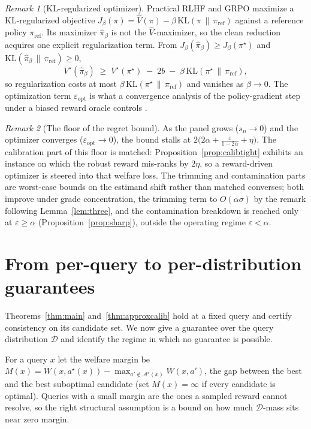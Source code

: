 \documentclass[11pt]{article}
\theoremstyle{plain}
\theoremstyle{definition}
\theoremstyle{remark}
\newtheorem{remark}{Remark}
\newcommand{\Ac}{\mathcal{A}}
\newcommand{\Dc}{\mathcal{D}}
\newcommand{\Wbar}{\overline{W}}
\newcommand{\eps}{\varepsilon}
\begin{document}
\begin{remark}[KL-regularized optimizer]
\label{rem:kl}
Practical RLHF and GRPO maximize a KL-regularized objective
$J_\beta(\pi)=\widehat V(\pi)-\beta\,\mathrm{KL}(\pi\,\|\,\pi_{\mathrm{ref}})$ against a reference
policy $\pi_{\mathrm{ref}}$. Its maximizer $\hat\pi_\beta$ is not the $\widehat V$-maximizer, so the
clean reduction acquires one explicit regularization term. From
$J_\beta(\hat\pi_\beta)\ge J_\beta(\pi^\star)$ and $\mathrm{KL}(\hat\pi_\beta\,\|\,\pi_{\mathrm{ref}})\ge0$,
\[
  V^\star(\hat\pi_\beta)\;\ge\;V^\star(\pi^\star)\;-\;2b\;-\;\beta\,\mathrm{KL}(\pi^\star\,\|\,\pi_{\mathrm{ref}}),
\]
so regularization costs at most $\beta\,\mathrm{KL}(\pi^\star\,\|\,\pi_{\mathrm{ref}})$ and vanishes as
$\beta\to0$. The optimization term $\eps_{\mathrm{opt}}$ is what a convergence analysis of the
policy-gradient step under a biased reward oracle controls \cite{biasedpg}.
\end{remark}

\begin{remark}[The floor of the regret bound]
\label{rem:floor}
As the panel grows ($s_n\to0$) and the optimizer converges ($\eps_{\mathrm{opt}}\to0$), the bound
stalls at $2\bigl(2\alpha+\tfrac{\eps}{1-2\alpha}+\eta\bigr)$. The calibration part of this floor is
matched: Proposition~\ref{prop:calibtight} exhibits an instance on which the robust reward mis-ranks
by $2\eta$, so a reward-driven optimizer is steered into that welfare loss. The trimming and
contamination parts are worst-case bounds on the estimand shift rather than matched converses; both
improve under grade concentration, the trimming term to $O(\alpha\sigma)$ by the remark following
Lemma~\ref{lem:three}, and the contamination breakdown is reached only at $\eps\ge\alpha$
(Proposition~\ref{prop:sharp}), outside the operating regime $\eps<\alpha$.
\end{remark}

\section{From per-query to per-distribution guarantees}
\label{sec:distributional}

Theorems~\ref{thm:main} and~\ref{thm:approxcalib} hold at a fixed query and certify consistency on
its candidate set. We now give a guarantee over the query distribution $\Dc$ and identify the
regime in which no guarantee is possible.

For a query $x$ let the welfare margin be
$M(x)=\Wbar(x,a^\star(x))-\max_{a'\notin\Ac^\star(x)}\Wbar(x,a')$, the gap between the best and the
best suboptimal candidate (set $M(x)=\infty$ if every candidate is optimal). Queries with a small
margin are the ones a sampled reward cannot resolve, so the right structural assumption is a bound
on how much $\Dc$-mass sits near zero margin.
\end{document}
